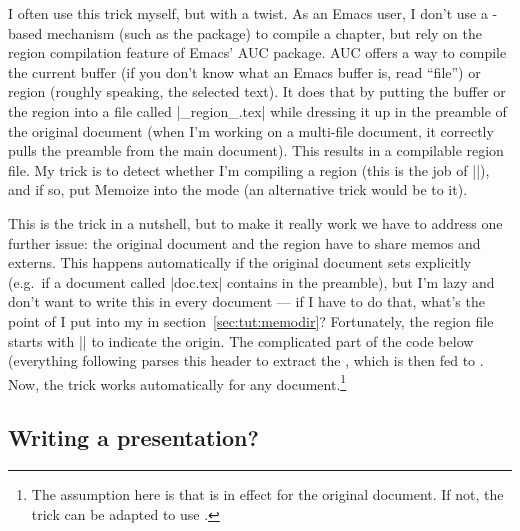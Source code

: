\documentclass[a4paper,11pt]{article}
\begin{document}
\begin{tcolorbox}[title=For \Emacs users]
  I often use this  trick myself, but with a twist.  As an Emacs user,
  I don't use a -based mechanism (such as the  package) to
  compile a chapter, but rely on the region compilation feature of Emacs'
  AUC package.  AUC offers a way to compile the current
  buffer (if you don't know what an Emacs buffer is, read ``file'') or region
  (roughly speaking, the selected text).  It does that by putting the buffer or
  the region into a file called |_region_.tex| while dressing it up in the
  preamble of the original document (when I'm working on a multi-file document,
  it correctly pulls the preamble from the main document).  This results in a
  compilable region file.  My trick is to detect whether I'm compiling a region
  (this is the job of |\ifregion|), and if so, put Memoize into the 
  mode (an alternative trick would be to  it).

  This is the trick in a nutshell, but to make it really work we have to
  address one further issue: the original document and the region have to share
  memos and externs.  This happens automatically if the original document sets
   explicitly (e.g.\ if a document called |doc.tex| contains
   in the preamble), but I'm lazy and don't want to
  write this in every document --- if I have to do that, what's the point of
   I put into my  in
  section~\ref{sec:tut:memodir}?  Fortunately, the region file starts with
  || to indicate the
  origin.  The complicated part of the code below (everything following
   parses this header to extract the
  , which is then fed to .  Now,
  the trick works automatically for any document.\footnote{The assumption here
    is that  is in effect for the original document.  If not,
    the trick can be adapted to use .}

\end{tcolorbox}


\subsection{Writing a presentation?}
\label{sec:tut:beamer}
\end{document}
